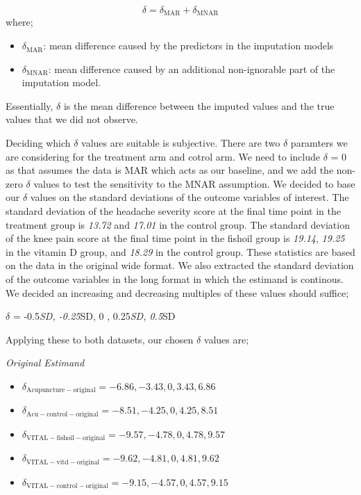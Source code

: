 \documentclass{article}
\providecommand{\tightlist}{%
  \setlength{\itemsep}{0pt}\setlength{\parskip}{0pt}}
\begin{document}
\[\delta = \delta_\mathrm{MAR} + \delta_\mathrm{MNAR}\] where;

\begin{itemize}
\tightlist
\item
  \(\delta_\mathrm{MAR}\): mean difference caused by the predictors in
  the imputation models
\item
  \(\delta_\mathrm{MNAR}\): mean difference caused by an additional
  non-ignorable part of the imputation model.
\end{itemize}

Essentially, \(\delta\) is the mean difference between the imputed
values and the true values that we did not observe.

Deciding which \(\delta\) values are suitable is subjective. There are
two \(\delta\) paramters we are considering for the treatment arm and
cotrol arm. We need to include \(\delta\) = 0 as that assumes the data
is MAR which acts as our baseline, and we add the non-zero \(\delta\)
values to test the sensitivity to the MNAR assumption. We decided to
base our \(\delta\) values on the standard deviations of the outcome
variables of interest. The standard deviation of the headache severity
score at the final time point in the treatment group is \emph{13.72} and
\emph{17.01} in the control group. The standard deviation of the knee
pain score at the final time point in the fishoil group is \emph{19.14},
\emph{19.25} in the vitamin D group, and \emph{18.29} in the control
group. These statistics are based on the data in the original wide
format. We also extracted the standard deviation of the outcome
variables in the long format in which the estimand is continous. We
decided an increasing and decreasing multiples of these values should
suffice;

\(\delta\) = -0.5\emph{SD, -0.25}SD, 0 , 0.25\emph{SD, 0.5}SD

Applying these to both datasets, our chosen \(\delta\) values are;

\emph{Original Estimand}

\begin{itemize}
\tightlist
\item
  \(\delta_\mathrm{Acupuncture-original} = -6.86, -3.43, 0, 3.43, 6.86\)\\
\item
  \(\delta_\mathrm{Acu-control-original} = -8.51, -4.25, 0, 4.25, 8.51\)\\
\item
  \(\delta_\mathrm{VITAL-fishoil-original} = -9.57, -4.78, 0, 4.78, 9.57\)\\
\item
  \(\delta_\mathrm{VITAL-vitd-original} = -9.62, -4.81, 0, 4.81, 9.62\)\\
\item
  \(\delta_\mathrm{VITAL-control-original} = -9.15, -4.57, 0, 4.57, 9.15\)
\end{itemize}
\end{document}
